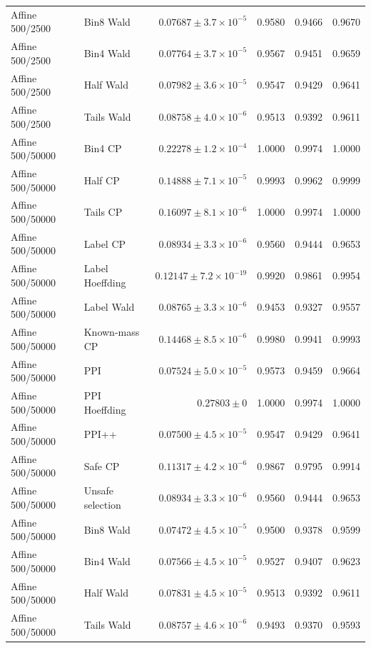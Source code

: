 \begin{longtable}{llrrrr}
Affine 500/2500 & Bin8 Wald & $0.07687\pm 3.7\times 10^{-5}$ & 0.9580 & 0.9466 & 0.9670 \\
Affine 500/2500 & Bin4 Wald & $0.07764\pm 3.7\times 10^{-5}$ & 0.9567 & 0.9451 & 0.9659 \\
Affine 500/2500 & Half Wald & $0.07982\pm 3.6\times 10^{-5}$ & 0.9547 & 0.9429 & 0.9641 \\
Affine 500/2500 & Tails Wald & $0.08758\pm 4.0\times 10^{-6}$ & 0.9513 & 0.9392 & 0.9611 \\
Affine 500/50000 & Bin4 CP & $0.22278\pm 1.2\times 10^{-4}$ & 1.0000 & 0.9974 & 1.0000 \\
Affine 500/50000 & Half CP & $0.14888\pm 7.1\times 10^{-5}$ & 0.9993 & 0.9962 & 0.9999 \\
Affine 500/50000 & Tails CP & $0.16097\pm 8.1\times 10^{-6}$ & 1.0000 & 0.9974 & 1.0000 \\
Affine 500/50000 & Label CP & $0.08934\pm 3.3\times 10^{-6}$ & 0.9560 & 0.9444 & 0.9653 \\
Affine 500/50000 & Label Hoeffding & $0.12147\pm 7.2\times 10^{-19}$ & 0.9920 & 0.9861 & 0.9954 \\
Affine 500/50000 & Label Wald & $0.08765\pm 3.3\times 10^{-6}$ & 0.9453 & 0.9327 & 0.9557 \\
Affine 500/50000 & Known-mass CP & $0.14468\pm 8.5\times 10^{-6}$ & 0.9980 & 0.9941 & 0.9993 \\
Affine 500/50000 & PPI & $0.07524\pm 5.0\times 10^{-5}$ & 0.9573 & 0.9459 & 0.9664 \\
Affine 500/50000 & PPI Hoeffding & $0.27803\pm 0$ & 1.0000 & 0.9974 & 1.0000 \\
Affine 500/50000 & PPI++ & $0.07500\pm 4.5\times 10^{-5}$ & 0.9547 & 0.9429 & 0.9641 \\
Affine 500/50000 & Safe CP & $0.11317\pm 4.2\times 10^{-6}$ & 0.9867 & 0.9795 & 0.9914 \\
Affine 500/50000 & Unsafe selection & $0.08934\pm 3.3\times 10^{-6}$ & 0.9560 & 0.9444 & 0.9653 \\
Affine 500/50000 & Bin8 Wald & $0.07472\pm 4.5\times 10^{-5}$ & 0.9500 & 0.9378 & 0.9599 \\
Affine 500/50000 & Bin4 Wald & $0.07566\pm 4.5\times 10^{-5}$ & 0.9527 & 0.9407 & 0.9623 \\
Affine 500/50000 & Half Wald & $0.07831\pm 4.5\times 10^{-5}$ & 0.9513 & 0.9392 & 0.9611 \\
Affine 500/50000 & Tails Wald & $0.08757\pm 4.6\times 10^{-6}$ & 0.9493 & 0.9370 & 0.9593 \\

\end{longtable}
